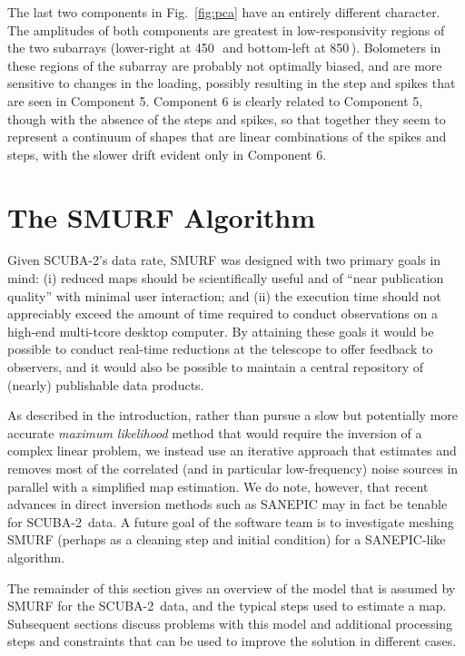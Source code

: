 \documentclass[useAMS,usenatbib,nofootinbib]{mn2e}
\newcommand{\scuba}{SCUBA-2}
\begin{document}
The last two components in Fig.~\ref{fig:pca} have an entirely
different character. The amplitudes of both components are greatest in
low-responsivity regions of the two subarrays (lower-right at
450\,\micron\ and bottom-left at 850\,\micron). Bolometers in these
regions of the subarray are probably not optimally biased, and are
more sensitive to changes in the loading, possibly resulting in the
step and spikes that are seen in Component 5. Component 6 is clearly
related to Component 5, though with the absence of the steps and
spikes, so that together they seem to represent a continuum of shapes
that are linear combinations of the spikes and steps, with the slower
drift evident only in Component 6.

\section{The SMURF Algorithm}
\label{sec:algorithm}

Given \scuba's data rate, SMURF was designed with two primary goals in
mind: (i) reduced maps should be scientifically useful and of ``near
publication quality'' with minimal user interaction; and (ii) the
execution time should not appreciably exceed the amount of time
required to conduct observations on a high-end multi-tcore desktop
computer. By attaining these goals it would be possible to conduct
real-time reductions at the telescope to offer feedback to observers,
and it would also be possible to maintain a central repository of
(nearly) publishable data products.

As described in the introduction, rather than pursue a slow but
potentially more accurate \emph{maximum likelihood} method that would
require the inversion of a complex linear problem, we instead use an
iterative approach that estimates and removes most of the correlated
(and in particular low-frequency) noise sources in parallel with a
simplified map estimation. We do note, however, that recent advances
in direct inversion methods such as SANEPIC \citep{patanchon2008} may
in fact be tenable for \scuba\ data. A future goal of the software
team is to investigate meshing SMURF (perhaps as a cleaning step and
initial condition) for a SANEPIC-like algorithm.

The remainder of this section gives an overview of the model that is
assumed by SMURF for the \scuba\ data, and the typical steps used to
estimate a map. Subsequent sections discuss problems with this model
and additional processing steps and constraints that can be used to
improve the solution in different cases.
\end{document}
